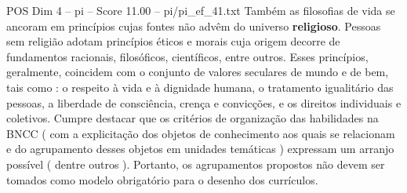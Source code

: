 \begin{textsample}{POS Dim 4 – pi – Score 11.00 – pi/pi\_ef\_41.txt}
Também as filosofias de vida se ancoram em princípios cujas fontes não advêm do universo \textbf{religioso}.
Pessoas sem religião adotam princípios éticos e morais cuja origem decorre de fundamentos racionais, filosóficos, científicos, entre outros.
Esses princípios, geralmente, coincidem com o conjunto de valores seculares de mundo e de bem, tais como : o respeito à vida e à dignidade humana, o tratamento igualitário das pessoas, a liberdade de consciência, crença e convicções, e os direitos individuais e coletivos.
Cumpre destacar que os critérios de organização das habilidades na BNCC ( com a explicitação dos objetos de conhecimento aos quais se relacionam e do agrupamento desses objetos em unidades temáticas ) expressam um arranjo possível ( dentre outros ).
Portanto, os agrupamentos propostos não devem ser tomados como modelo obrigatório para o desenho dos currículos.

\end{textsample}
